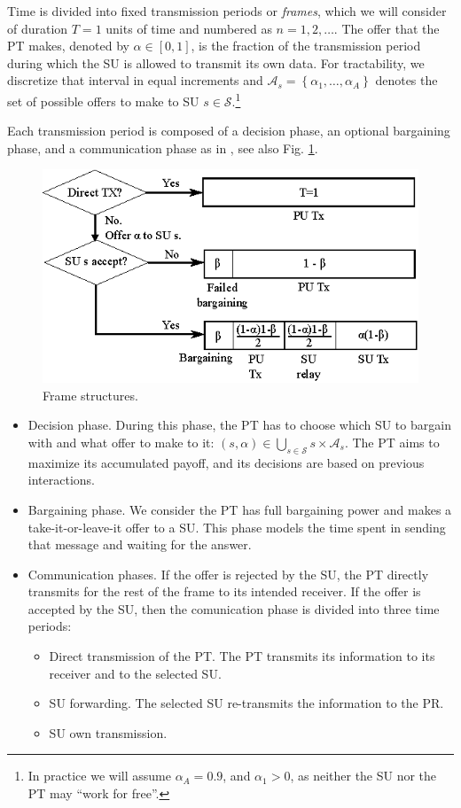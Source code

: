 Time is divided into fixed transmission periods or \textit{frames}, which we will consider of duration $T = 1$ units of time and numbered as $n=1,2,\ldots$. 
The offer that the PT makes, denoted by $\alpha \in [0,1]$, is the fraction of the transmission period during which the SU is allowed to transmit its own data.
For tractability, we discretize that interval in equal increments and $\mathcal{A}_s = \left\{\alpha_{1},\ldots,\alpha_{A}\right\}$ denotes the set of possible offers to make to SU $s \in \mathcal{S}$.\footnote{In practice we will assume $\alpha_A = 0.9$, and $\alpha_1>0$, as neither the SU nor the PT may ``work for free''.} 

Each transmission period is composed of a decision phase, an optional bargaining phase, and a communication phase as in \cite{ref:Simeone2008,ref:Yan2013}, see also Fig. \ref{fig:phase}. 

\begin{figure}[!t]
\centering
\includegraphics{phase.eps}
\caption{Frame structures.}
\label{fig:phase}
\end{figure}

\begin{itemize}
\item Decision phase. During this phase, the PT has to choose which SU to bargain with and what offer to make to it: $(s,\alpha)\in\underset{s\in\mathcal{S}}\bigcup s\times\mathcal{A}_s$. The PT aims to maximize its accumulated payoff, and its decisions are based on previous interactions.
\item Bargaining phase. We consider the PT has full bargaining power and makes a take-it-or-leave-it offer to a SU. This phase models the time spent in sending that message and waiting for the answer. 
\item Communication phases. If the offer is rejected by the SU, the PT directly transmits for the rest of the frame to its intended receiver. 
If the offer is accepted by the SU, then the comunication phase is divided into three time periods: 
\begin{itemize}
\item Direct transmission of the PT. The PT transmits its information to its receiver and to the selected SU.
\item SU forwarding. The selected SU re-transmits the information to the PR.
\item SU own transmission.
\end{itemize}
\end{itemize}

